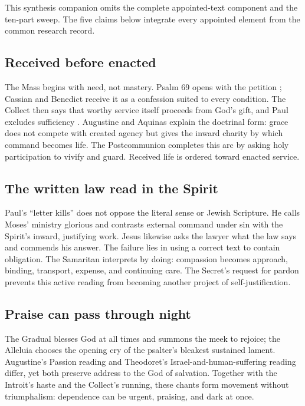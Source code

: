 This synthesis companion omits the complete appointed-text component and the
ten-part sweep. The five claims below integrate every appointed element from
the common research record.

\subsection*{Received before enacted}

The Mass begins with need, not mastery. Psalm 69 opens with the petition
; Cassian and Benedict receive it as a confession
suited to every condition. The Collect then says that worthy
service itself proceeds from God's gift, and Paul excludes sufficiency
. Augustine and Aquinas explain the doctrinal form: grace
does not compete with created agency but gives the inward charity by which
command becomes life. The Postcommunion completes this arc by asking holy
participation to vivify and guard. Received life is ordered toward enacted
service.

\subsection*{The written law read in the Spirit}

Paul's ``letter kills'' does not oppose the literal sense or Jewish Scripture.
He calls Moses' ministry glorious and contrasts external command under sin
with the Spirit's inward, justifying work. Jesus likewise asks the lawyer what
the law says and commends his answer. The failure lies in using a correct text
to contain obligation. The Samaritan interprets by doing: compassion becomes
approach, binding, transport, expense, and continuing care. The Secret's
request for pardon prevents this active reading from becoming another project
of self-justification.

\subsection*{Praise can pass through night}

The Gradual blesses God at all times and summons the meek to rejoice; the
Alleluia chooses the opening cry of the psalter's bleakest sustained lament.
Augustine's Passion reading and Theodoret's Israel-and-human-suffering reading
differ, yet both preserve address to the God of salvation. Together with the
Introit's haste and the Collect's running, these chants form movement without
triumphalism: dependence can be urgent, praising, and dark at once.

